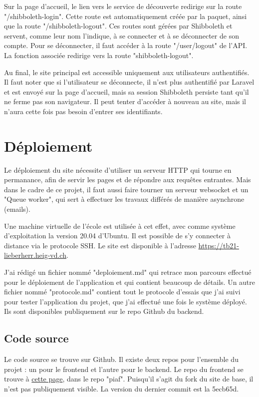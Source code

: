 \documentclass[
    iai, %
    eai, %
]{heig-tb}
\begin{document}
Sur la page d'accueil, le lien vers le service de découverte redirige sur la route "/shibboleth-login". Cette route est automatiquement créée par la paquet, ainsi que la route "/shibboleth-logout". Ces routes sont gérées par Shibboleth et servent, comme leur nom l'indique, à se connecter et à se déconnecter de son compte.
Pour se déconnecter, il faut accéder à la route "/user/logout" de l'API. La fonction associée redirige vers la route "shibboleth-logout".

Au final, le site principal est accessible uniquement aux utilisateurs authentifiés. Il faut noter que si l'utilisateur se déconnecte, il n'est plus authentifié par Laravel et est envoyé sur la page d'accueil, mais sa session Shibboleth persiste tant qu'il ne ferme pas son navigateur. Il peut tenter d'accéder à nouveau au site, mais il n'aura cette fois pas besoin d'entrer ses identifiants.


\newpage
\chapter{Déploiement}
Le déploiement du site nécessite d'utiliser un serveur HTTP qui tourne en permanance, afin de servir les pages et de répondre aux requêtes entrantes. Mais dans le cadre de ce projet, il faut aussi faire tourner un serveur websocket et un "Queue worker", qui sert à effectuer les travaux différés de manière asynchrone (emails).

Une machine virtuelle de l'école est utilisée à cet effet, avec comme système d'exploitation la version 20.04 d'Ubuntu. Il est possible de s'y connecter à distance via le protocole SSH. Le site est disponible à l'adresse \href{https://tb21-lieberherr.heig-vd.ch}{https://tb21-lieberherr.heig-vd.ch}.

J'ai rédigé un fichier nommé "deploiement.md" qui retrace mon parcours effectué pour le déploiement de l'application et qui contient beaucoup de détails.
Un autre fichier nommé "protocole.md" contient tout le protocole d'essais que j'ai suivi pour tester l'application du projet, que j'ai effectué une fois le système déployé.
Ils sont disponibles publiquement sur le repo Github du backend.

\section{Code source}
Le code source se trouve sur Github. Il existe deux repos pour l'ensemble du projet : un pour le frontend et l'autre pour le backend.
Le repo du frontend se trouve à \href{https://github.com/TristanLieberherr/piaf}{cette page}, dans le repo "piaf". Puisqu'il s'agit du fork du site de base, il n'est pas publiquement visible.
La version du dernier commit est la 5ecb65d.
\end{document}

